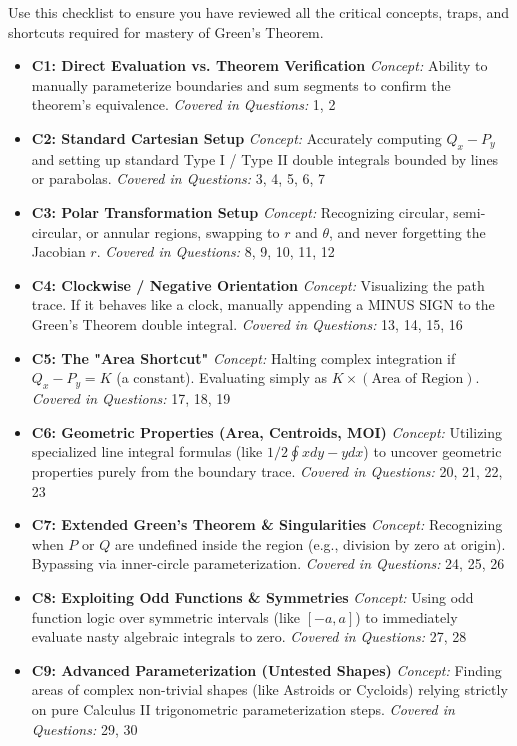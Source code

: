 \documentclass[11pt]{article}
\begin{document}
Use this checklist to ensure you have reviewed all the critical concepts, traps, and shortcuts required for mastery of Green's Theorem.

\begin{itemize}[label=$\square$, leftmargin=*]
    \item \textbf{C1: Direct Evaluation vs. Theorem Verification} 
    \textit{Concept:} Ability to manually parameterize boundaries and sum segments to confirm the theorem's equivalence.
    \textit{Covered in Questions:} 1, 2

    \item \textbf{C2: Standard Cartesian Setup}
    \textit{Concept:} Accurately computing $Q_x - P_y$ and setting up standard Type I / Type II double integrals bounded by lines or parabolas.
    \textit{Covered in Questions:} 3, 4, 5, 6, 7

    \item \textbf{C3: Polar Transformation Setup}
    \textit{Concept:} Recognizing circular, semi-circular, or annular regions, swapping to $r$ and $\theta$, and never forgetting the Jacobian $r$.
    \textit{Covered in Questions:} 8, 9, 10, 11, 12

    \item \textbf{C4: Clockwise / Negative Orientation}
    \textit{Concept:} Visualizing the path trace. If it behaves like a clock, manually appending a MINUS SIGN to the Green's Theorem double integral.
    \textit{Covered in Questions:} 13, 14, 15, 16

    \item \textbf{C5: The "Area Shortcut"}
    \textit{Concept:} Halting complex integration if $Q_x - P_y = K$ (a constant). Evaluating simply as $K \times (\text{Area of Region})$.
    \textit{Covered in Questions:} 17, 18, 19

    \item \textbf{C6: Geometric Properties (Area, Centroids, MOI)}
    \textit{Concept:} Utilizing specialized line integral formulas (like $1/2 \oint xdy - ydx$) to uncover geometric properties purely from the boundary trace.
    \textit{Covered in Questions:} 20, 21, 22, 23

    \item \textbf{C7: Extended Green's Theorem \& Singularities}
    \textit{Concept:} Recognizing when $P$ or $Q$ are undefined inside the region (e.g., division by zero at origin). Bypassing via inner-circle parameterization.
    \textit{Covered in Questions:} 24, 25, 26

    \item \textbf{C8: Exploiting Odd Functions \& Symmetries}
    \textit{Concept:} Using odd function logic over symmetric intervals (like $[-a, a]$) to immediately evaluate nasty algebraic integrals to zero.
    \textit{Covered in Questions:} 27, 28

    \item \textbf{C9: Advanced Parameterization (Untested Shapes)}
    \textit{Concept:} Finding areas of complex non-trivial shapes (like Astroids or Cycloids) relying strictly on pure Calculus II trigonometric parameterization steps.
    \textit{Covered in Questions:} 29, 30
\end{itemize}
\end{document}

